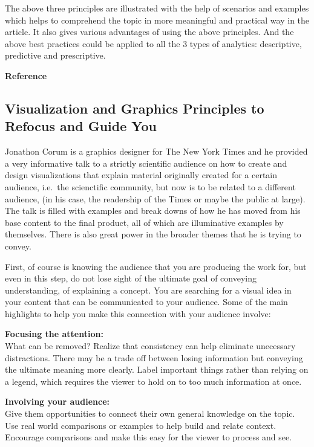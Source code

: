 \documentclass[]{book}
\theoremstyle{definition}
\theoremstyle{definition}
\theoremstyle{definition}
\theoremstyle{remark}
\begin{document}
The above three principles are illustrated with the help of scenarios
and examples which helps to comprehend the topic in more meaningful and
practical way in the article. It also gives various advantages of using
the above principles. And the above best practices could be applied to
all the 3 types of analytics: descriptive, predictive and prescriptive.

\textbf{Reference} \citep{practitioners_guide}

\subsection{Visualization and Graphics Principles to Refocus and Guide
You}\label{visualization-and-graphics-principles-to-refocus-and-guide-you}

Jonathon Corum is a graphics designer for The New York Times and he
provided a very informative talk to a strictly scientific audience on
how to create and design visualizations that explain material originally
created for a certain audience, i.e.~the scienctific community, but now
is to be related to a different audience, (in his case, the readership
of the Times or maybe the public at large). The talk is filled with
examples and break downs of how he has moved from his base content to
the final product, all of which are illuminative examples by themselves.
There is also great power in the broader themes that he is trying to
convey.

First, of course is knowing the audience that you are producing the work
for, but even in this step, do not lose sight of the ultimate goal of
conveying understanding, of explaining a concept. You are searching for
a visual idea in your content that can be communicated to your audience.
Some of the main highlights to help you make this connection with your
audience involve:

\textbf{Focusing the attention:}\\
What can be removed? Realize that consistency can help eliminate
unecessary distractions. There may be a trade off between losing
information but conveying the ultimate meaning more clearly. Label
important things rather than relying on a legend, which requires the
viewer to hold on to too much information at once.

\textbf{Involving your audience:}\\
Give them opportunities to connect their own general knowledge on the
topic. Use real world comparisons or examples to help build and relate
context. Encourage comparisons and make this easy for the viewer to
process and see.
\end{document}
